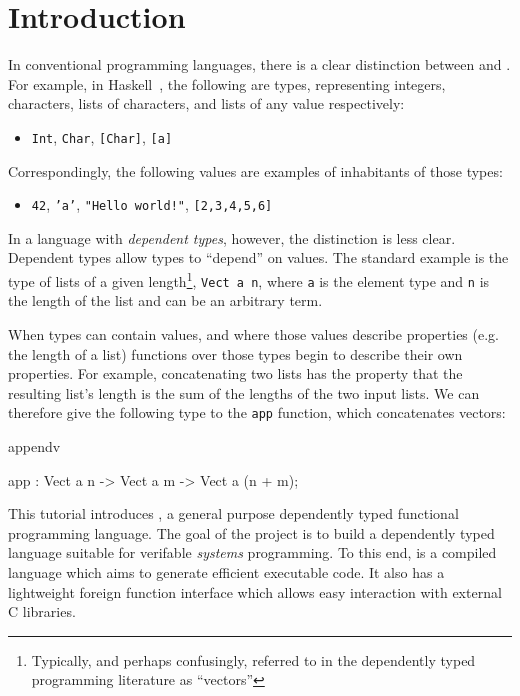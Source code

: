 \section{Introduction}

In conventional programming languages, there is a clear distinction between
 and . For example, in Haskell~\cite{haskell-report},
the following are types, representing integers, characters, lists of characters,
and lists of any value respectively:

\begin{itemize}
\item \texttt{Int}, \texttt{Char}, \texttt{[Char]}, \texttt{[a]}
\end{itemize}

\noindent
Correspondingly, the following values are examples of inhabitants of those types:

\begin{itemize}
\item \texttt{42}, \texttt{'a'}, \texttt{"Hello world!"}, \texttt{[2,3,4,5,6]}
\end{itemize}

In a language with \emph{dependent types}, however, the distinction is less
clear.  Dependent types allow types to ``depend'' on values. The standard
example is the type of lists of a given length\footnote{Typically, and perhaps
confusingly, referred to in the dependently typed programming literature as
``vectors''}, \texttt{Vect a n}, where \texttt{a} is the element type and
\texttt{n} is the length of the list and can be an arbitrary
term.

When types can contain values, and where those values describe properties (e.g.
the length of a list)
functions over those types begin to describe their own properties. For example,
concatenating two lists has the property that the resulting list's length is
the sum of the lengths of the two input lists. We can therefore give the following type 
to the  \texttt{app} function, which concatenates vectors: 

\begin{SaveVerbatim}{appendv}

app : Vect a n -> Vect a m -> Vect a (n + m);

\end{SaveVerbatim}


This tutorial introduces \Idris{}, a general purpose dependently typed functional 
programming language.
The goal of the \Idris{} project is to build a dependently typed language suitable
for verifable \emph{systems} programming. To this end, \Idris{} is a compiled language
which aims to generate efficient executable code. It also has a lightweight foreign
function interface which allows easy interaction with external C libraries.


